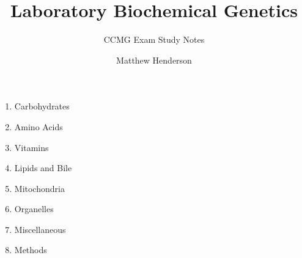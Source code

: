 \documentclass{scrartcl}
\title{Laboratory Biochemical Genetics}
\author{Matthew Henderson}
\subtitle{CCMG Exam Study Notes}
\begin{document}
\maketitle

\vspace*{100}
\begin{center}
  \begin{enumerate}\bfseries\Large
  \item Carbohydrates
  \item Amino Acids
  \item Vitamins
  \item Lipids and Bile
  \item Mitochondria
  \item Organelles
  \item Miscellaneous
  \item Methods
  \end{enumerate}
\end{center}
\end{document}
